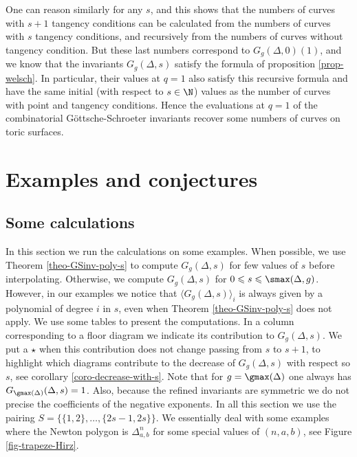 \begin{rema}
One can reason similarly for any $s$, and this shows that the numbers of curves with $s+1$ tangency conditions can be calculated from the numbers of curves with $s$ tangency conditions, and recursively from the numbers of curves without tangency condition. 
But these last numbers correspond to $G_g(\Delta,0)(1)$, and we know that the invariants $G_g(\Delta,s)$ satisfy the formula of proposition \ref{prop-welsch}.
In particular, their values at $q=1$ also satisfy this recursive formula and have the same initial (with respect to $s\in\N$) values as the number of curves with point and tangency conditions. Hence the evaluations at $q=1$ of the combinatorial Göttsche-Schroeter invariants recover some numbers of curves on toric surfaces.
\end{rema}



\section{Examples and conjectures}

\subsection{Some calculations} \label{subsec-ex-combi-GS-inv}

In this section we run the calculations on some examples. When possible, we use Theorem \ref{theo-GSinv-poly-s} to compute $G_g(\Delta,s)$ for few values of $s$ before interpolating. Otherwise, we compute $G_g(\Delta,s)$ for $0\leqslant s \leqslant \smax(\Delta,g)$. However, in our examples we notice that $\langle G_g(\Delta,s) \rangle_i$ is always given by a polynomial of degree $i$ in $s$, even when Theorem \ref{theo-GSinv-poly-s} does not apply. 
We use some tables to present the computations. In a column corresponding to a floor diagram we indicate its contribution to $G_g(\Delta,s)$. We put a $\star$ when this contribution does not change passing from $s$ to $s+1$, to highlight which diagrams contribute to the decrease of $G_g(\Delta,s)$ with respect so $s$, see corollary \ref{coro-decrease-with-s}. Note that for $g=\gmax(\Delta)$ one always has $G_{\gmax(\Delta)}(\Delta,s)=1$. Also, because the refined invariants are symmetric we do not precise the coefficients of the negative exponents. In all this section we use the pairing $S = \{\{1,2\},\dots,\{2s-1,2s\}\}$. We essentially deal with some examples where the Newton polygon is $\Delta^n_{a,b}$ for some special values of $(n,a,b)$, see Figure \ref{fig-trapeze-Hirz}.


